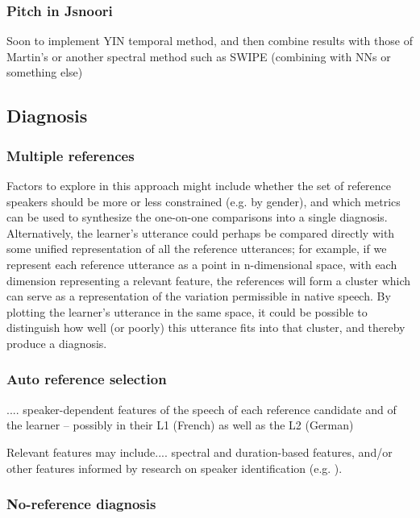 	\subsubsection{Pitch in Jsnoori}
	Soon to implement YIN \citep{Cheveigne2002} temporal method, and then combine results with those of Martin's or another spectral method such as SWIPE \citep{Camacho2007} (combining with NNs or something else)
	
	
	
	\subsection{Diagnosis}
	
	\subsubsection{Multiple references}
	Factors to explore in this approach might include whether the set of reference speakers should be more or less constrained (e.g. by gender), and which metrics can be used to synthesize the one-on-one comparisons into a single diagnosis.
	Alternatively, the learner's utterance could perhaps be compared directly with some unified representation of all the reference utterances; for example, if we represent each reference utterance as a point in n-dimensional space, with each dimension representing a relevant feature, the references will form a cluster which can serve as a representation of the variation permissible in native speech. By plotting the learner's utterance in the same space, it could be possible to distinguish how well (or poorly) this utterance fits into that cluster, and thereby produce a diagnosis.
	
	\subsubsection{Auto reference selection}
	.... speaker-dependent features of the speech of each reference candidate and of the learner -- possibly in their L1 (French) as well as the L2 (German) 
	
	 Relevant features may include.... spectral and duration-based features, and/or other features informed by research on speaker identification (e.g. \cite{Shriberg2005}). 
	 
	 \subsubsection{No-reference diagnosis}
	 
